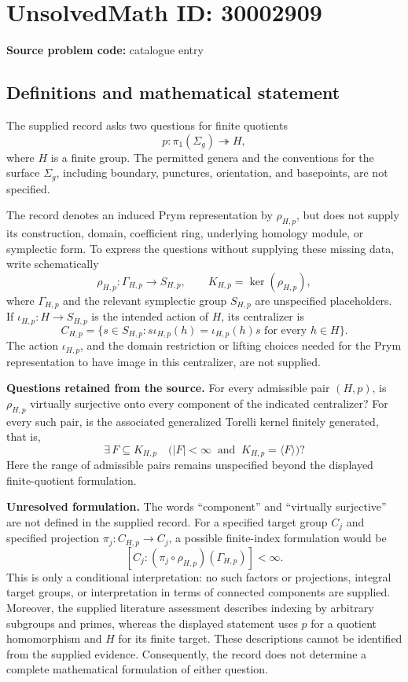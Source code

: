 \documentclass[11pt]{article}
\begin{document}
\section*{UnsolvedMath ID: 30002909}
\textbf{Source problem code:} catalogue entry
\subsection{Definitions and mathematical statement}
The supplied record asks two questions for finite quotients
\[
p:\pi_1(\Sigma_g)\twoheadrightarrow H,
\]
where \(H\) is a finite group. The permitted genera and the conventions for the surface \(\Sigma_g\), including boundary, punctures, orientation, and basepoints, are not specified.

The record denotes an induced Prym representation by \(\rho_{H,p}\), but does not supply its construction, domain, coefficient ring, underlying homology module, or symplectic form. To express the questions without supplying these missing data, write schematically
\[
\rho_{H,p}:\Gamma_{H,p}\longrightarrow S_{H,p},
\qquad
K_{H,p}=\ker(\rho_{H,p}),
\]
where \(\Gamma_{H,p}\) and the relevant symplectic group \(S_{H,p}\) are unspecified placeholders. If \(\iota_{H,p}:H\to S_{H,p}\) is the intended action of \(H\), its centralizer is
\[
C_{H,p}=\{s\in S_{H,p}:s\iota_{H,p}(h)=\iota_{H,p}(h)s\text{ for every }h\in H\}.
\]
The action \(\iota_{H,p}\), and the domain restriction or lifting choices needed for the Prym representation to have image in this centralizer, are not supplied.

\textbf{Questions retained from the source.} For every admissible pair \((H,p)\), is \(\rho_{H,p}\) virtually surjective onto every component of the indicated centralizer? For every such pair, is the associated generalized Torelli kernel finitely generated, that is,
\[
\exists\,F\subseteq K_{H,p}\quad
\bigl(|F|<\infty\ \text{ and }\ K_{H,p}=\langle F\rangle\bigr)?
\]
Here the range of admissible pairs remains unspecified beyond the displayed finite-quotient formulation.

\textbf{Unresolved formulation.} The words ``component'' and ``virtually surjective'' are not defined in the supplied record. For a specified target group \(C_j\) and specified projection \(\pi_j:C_{H,p}\to C_j\), a possible finite-index formulation would be
\[
[C_j:(\pi_j\circ\rho_{H,p})(\Gamma_{H,p})]<\infty.
\]
This is only a conditional interpretation: no such factors or projections, integral target groups, or interpretation in terms of connected components are supplied. Moreover, the supplied literature assessment describes indexing by arbitrary subgroups and primes, whereas the displayed statement uses \(p\) for a quotient homomorphism and \(H\) for its finite target. These descriptions cannot be identified from the supplied evidence. Consequently, the record does not determine a complete mathematical formulation of either question.
\end{document}

